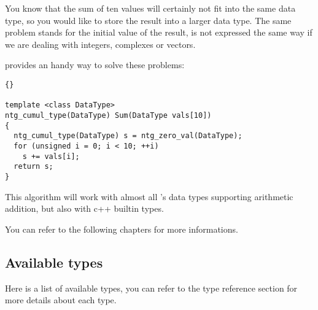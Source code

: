 You know that the sum of ten values will certainly not fit into the
same data type, so you would like to store the result into a larger
data type. The same problem stands for the initial value of the
result,  is not expressed the same way if we are dealing with
integers, complexes or vectors.

{\integre} provides an handy way to solve these problems:

\begin{lstlisting}{}

template <class DataType>
ntg_cumul_type(DataType) Sum(DataType vals[10])
{
  ntg_cumul_type(DataType) s = ntg_zero_val(DataType);
  for (unsigned i = 0; i < 10; ++i)
    s += vals[i];
  return s;
}

\end{lstlisting}

This algorithm will work with almost all {\integre}'s data types
supporting arithmetic addition, but also with c++ builtin types.

You can refer to the following chapters for more informations.

\subsection{Available types}

Here is a list of available types, you can refer to the type reference
section for more details about each type.

